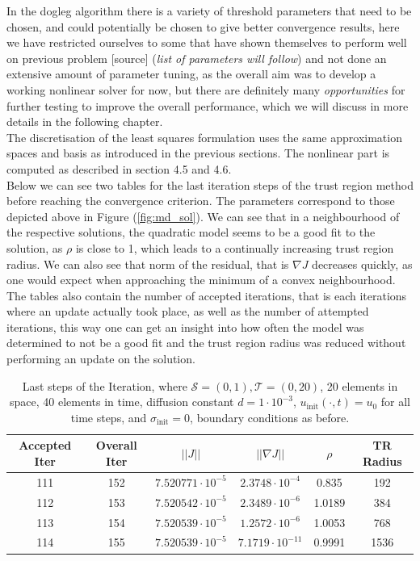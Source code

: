 \documentclass[../draft_1.tex]{subfiles}
\begin{document}
In the dogleg algorithm there is a variety of threshold parameters that need to be chosen, and could potentially be chosen to give better convergence results, here we have restricted ourselves to some that have shown themselves to perform well on previous problem [source] (\textit{list of parameters will follow}) and not done an extensive amount of parameter tuning, as the overall aim was to develop a working nonlinear solver for now, but there are definitely many \textit{opportunities} for further testing to improve the overall performance, which we will discuss in more details in the following chapter. \\
The discretisation of the least squares formulation uses the same approximation spaces and basis as introduced in the previous sections. The nonlinear part is computed as described in section 4.5 and 4.6. 
\\
Below we can see two tables for the last iteration steps of the trust region method before reaching the convergence criterion. The parameters correspond to those depicted above in Figure (\ref{fig:md_sol}). We can see that in a neighbourhood of the respective solutions, the quadratic model seems to be a good fit to the solution, as $\rho$ is close to 1, which leads to a continually increasing trust region radius. We can also see that norm of the residual, that is $\nabla J$ decreases quickly, as one would expect when approaching the minimum of a convex neighbourhood. The tables also contain the number of accepted iterations, that is each iterations where an update actually took place, as well as the number of attempted iterations, this way one can get an insight into how often the model was determined to not be a good fit and the trust region radius was reduced without performing an update on the solution. 
\begin{table}[h!]
	\begin{center}
		\begin{tabular}{c | c | c | c | c  | c } 
			\toprule
			Accepted Iter & Overall Iter & $ || J || $ & $|| \nabla J ||$ & $\rho$ &TR Radius  \\
			\toprule
			111 & 152 & $7.520771 \cdot 10^{-5}$  & $2.3748 \cdot 10^{-4}$ & 0.835 & 192 \\ 
			112 & 153 & $7.520542 \cdot 10^{-5}$ & $2.3489 \cdot 10^{-6}$ & 1.0189 & 384 \\
			113 & 154 & $7.520539 \cdot 10^{-5}$ & $1.2572 \cdot 10^{-6}$ & 1.0053 & 768\\
			114 & 155 & $7.520539 \cdot 10^{-5}$ & $7.1719 \cdot 10^{-11}$ & 0.9991 & 1536 \\
			\bottomrule
		\end{tabular}
	\end{center}
	\caption{Last steps of the Iteration, where $\mathcal{S} = (0, 1), \mathcal{T} = (0, 20)$, 20 elements in space, 40 elements in time, diffusion constant $d=1 \cdot 10^{-3}$, $u_{\text{init}} (\cdot,t)= u_0$ for all time steps, and $\sigma_{\text{init}} = 0$, boundary conditions as before.}
	\label{table: conv_results_small_dif}
\end{table} 
\end{document}
